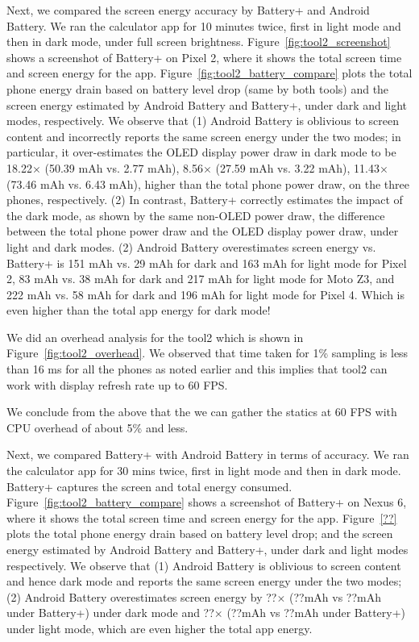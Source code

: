 Next, we compared the screen energy accuracy by 
Battery+ and Android Battery.
We ran the calculator app for 10 minutes twice, first in light mode and then in
dark mode, under full screen brightness.
Figure~\ref{fig:tool2_screenshot} shows a screenshot of
Battery+ on Pixel 2, where it shows the total screen time and screen energy
for the app.
Figure~\ref{fig:tool2_battery_compare} plots the
total phone energy drain based on battery level drop (same by  both tools)
and the screen energy estimated by Android Battery and Battery+,
under dark and light modes, respectively.
We observe that
(1) Android Battery is oblivious to screen content and incorrectly reports
the same screen energy under the two modes;
in particular, it over-estimates the  OLED display power draw in dark mode
to be 18.22$\times$ (50.39 mAh vs. 2.77 mAh), 
8.56$\times$ (27.59 mAh vs. 3.22 mAh), 
11.43$\times$ (73.46 mAh vs. 6.43 mAh),
higher than the total phone power draw, on the three phones, respectively.
(2) In contrast, Battery+ correctly estimates the impact of the dark mode,
as shown by the same non-OLED power draw, \ie the difference 
between the total phone power draw and the OLED display power draw,
under light and dark modes.
(2) Android Battery overestimates screen energy vs. Battery+ is
151 mAh vs. 29 mAh for dark and 163 mAh for light mode for Pixel 2,
83 mAh vs. 38 mAh for dark and 217 mAh for light mode for Moto Z3, and
222 mAh vs. 58 mAh for dark and 196 mAh for light mode for Pixel 4.
Which is even higher than the total app energy for dark mode!
\fi

We did an overhead analysis for the tool2 which is shown in Figure~\ref{fig:tool2_overhead}.
We observed that time taken for 1\% sampling is less than 16 ms for all the phones
as noted earlier and this  implies that tool2 can work with display refresh rate up to 60 FPS.

We conclude from the above that the we can gather the statics at
60 FPS with CPU overhead of about 5\% and less.

Next, we compared Battery+ with Android Battery in terms of accuracy.
We ran the calculator app for 30 mins twice, first in light mode and then in
dark mode. Battery+ captures the screen and total energy
consumed. 
Figure~\ref{fig:tool2_battery_compare} shows a screenshot of
Battery+ on Nexus 6, where it shows the total screen time and screen energy
for the app.
Figure~\ref{??} plots the
total phone energy drain based on battery level drop;
and the screen energy estimated by Android Battery and Battery+,
under dark and light modes respectively.
We observe that
(1) Android Battery is oblivious to screen content and hence
dark mode and reports the same screen energy under the two modes;
(2) Android Battery overestimates screen energy
by ??$\times$ (??mAh vs ??mAh under Battery+) under dark mode
and ??$\times$ (??mAh vs ??mAh under Battery+) under light mode,
which are even higher the total app energy.
\fi

